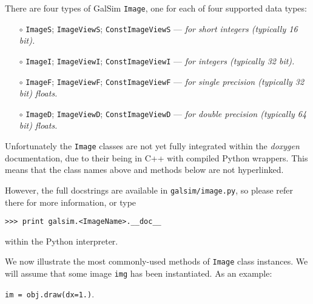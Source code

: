 \documentclass[preprint,11pt]{aastex}
\begin{document}
There are four types of GalSim \texttt{Image}, one for each of four
supported data types:
\begin{itemize}

\item[$\circ$] \texttt{ImageS}; \texttt{ImageViewS};
  \texttt{ConstImageViewS} --- \emph{for short integers (typically 16 bit).}

\item[$\circ$] \texttt{ImageI}; \texttt{ImageViewI};
  \texttt{ConstImageViewI} --- \emph{for integers (typically 32 bit).}

\item[$\circ$] \texttt{ImageF}; \texttt{ImageViewF};
  \texttt{ConstImageViewF} --- \emph{for single precision (typically 32 bit)
  floats.}

\item[$\circ$] \texttt{ImageD}; \texttt{ImageViewD};
  \texttt{ConstImageViewD} --- \emph{for double precision (typically 64 bit)
  floats.}

\end{itemize}
Unfortunately the \texttt{Image} classes are not yet fully integrated within
the \emph{doxygen} documentation, due to their being in C++ with compiled
Python wrappers.  This means that the class names above and methods below are not
hyperlinked.

However, the full docstrings are available in
\texttt{galsim/image.py}, so please refer there for more information,
or type

{\tt >>> print galsim.<ImageName>.\_\_doc\_\_}

within the Python interpreter.

We now illustrate the most commonly-used methods of \texttt{Image}
class instances.
We will assume that some image \texttt{img} 
has been instantiated. As an example:

{\tt im = obj.draw(dx=1.)}.
\end{document}
